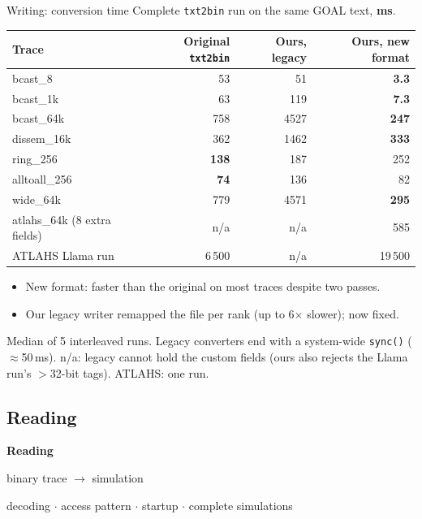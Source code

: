 \documentclass[aspectratio=169,11pt]{beamer}
\begin{document}
\begin{frame}{Writing: conversion time}
\small
Complete \texttt{txt2bin} run on the same GOAL text, \textbf{ms}.
\vspace{1mm}

\centering
\footnotesize
\begin{tabular}{lrrr}
\toprule
\textbf{Trace} & \textbf{Original \texttt{txt2bin}} & \textbf{Ours, legacy} & \textbf{Ours, new format} \\
\midrule
bcast\_8 & 53 & 51 & \textbf{3.3} \\
bcast\_1k & 63 & 119 & \textbf{7.3} \\
bcast\_64k & 758 & 4527 & \textbf{247} \\
dissem\_16k & 362 & 1462 & \textbf{333} \\
ring\_256 & \textbf{138} & 187 & 252 \\
alltoall\_256 & \textbf{74} & 136 & 82 \\
wide\_64k & 779 & 4571 & \textbf{295} \\
atlahs\_64k (8 extra fields) & n/a & n/a & 585 \\
\midrule
ATLAHS Llama run & 6\,500 & n/a & 19\,500 \\
\bottomrule
\end{tabular}
\par\raggedright\vspace{3mm}
\small
\begin{itemize}
\item New format: faster than the original on most traces despite two passes.
\item Our legacy writer remapped the file per rank (up to 6$\times$ slower); now fixed.
\end{itemize}
{\scriptsize\color{black!60}\par
Median of 5 interleaved runs. Legacy converters end with a system-wide \texttt{sync()} ($\approx$50\,ms). n/a: legacy cannot hold the custom fields (ours also rejects the Llama run's ${>}$32-bit tags). ATLAHS: one run.}
\end{frame}

\subsection{Reading}

\begin{frame}
\centering\vfill
{\Huge\bfseries Reading\par}
\vspace{3mm}
{\large binary trace $\to$ simulation\par}
\vspace{3mm}
{\small\color{black!60}decoding $\cdot$ access pattern $\cdot$ startup $\cdot$ complete simulations\par}
\vfill
\end{frame}
\end{document}
